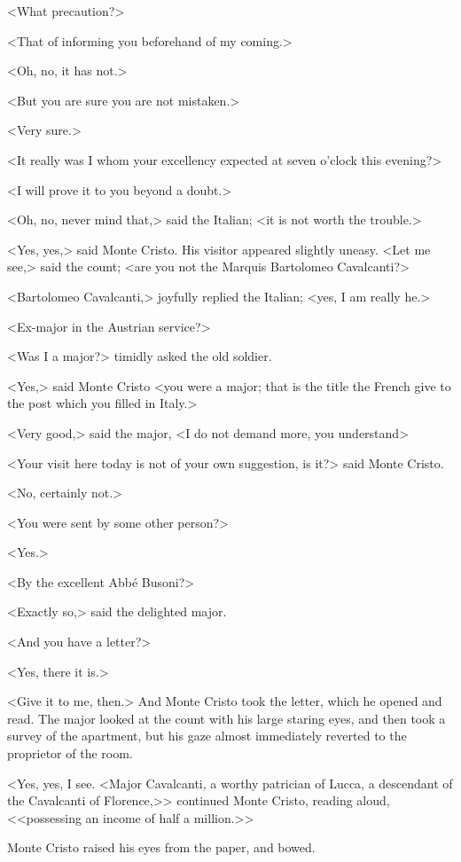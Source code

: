 <What precaution?> 

 <That of informing you beforehand of my coming.> 

 <Oh, no, it has not.> 

 <But you are sure you are not mistaken.> 

 <Very sure.> 

 <It really was I whom your excellency expected at seven o'clock this evening?> 

 <I will prove it to you beyond a doubt.> 

 <Oh, no, never mind that,> said the Italian; <it is not worth the trouble.> 

 <Yes, yes,> said Monte Cristo. His visitor appeared slightly uneasy. <Let me see,> said the count; <are you not the Marquis Bartolomeo Cavalcanti?> 

 <Bartolomeo Cavalcanti,> joyfully replied the Italian; <yes, I am really he.> 

 <Ex-major in the Austrian service?> 

 <Was I a major?> timidly asked the old soldier. 

 <Yes,> said Monte Cristo <you were a major; that is the title the French give to the post which you filled in Italy.> 

 <Very good,> said the major, <I do not demand more, you understand\longdash> 

 <Your visit here today is not of your own suggestion, is it?> said Monte Cristo. 

 <No, certainly not.> 

 <You were sent by some other person?> 

 <Yes.> 

 <By the excellent Abbé Busoni?> 

 <Exactly so,> said the delighted major. 

 <And you have a letter?> 

 <Yes, there it is.> 

 <Give it to me, then.> And Monte Cristo took the letter, which he opened and read. The major looked at the count with his large staring eyes, and then took a survey of the apartment, but his gaze almost immediately reverted to the proprietor of the room. 

 <Yes, yes, I see. <Major Cavalcanti, a worthy patrician of Lucca, a descendant of the Cavalcanti of Florence,>> continued Monte Cristo, reading aloud, <<possessing an income of half a million.>> 

 Monte Cristo raised his eyes from the paper, and bowed. 

